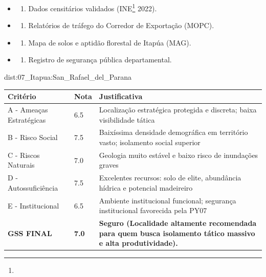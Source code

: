 {\begin{itemize}
\tightlist
\item
  \begin{enumerate}
  \def\labelenumi{\arabic{enumi})}
  \tightlist
  \item
    Dados censitários validados (INE\footnote{\fineINE} 2022).
  \end{enumerate}
\item
  \begin{enumerate}
  \def\labelenumi{\arabic{enumi})}
  \setcounter{enumi}{1}
  \tightlist
  \item
    Relatórios de tráfego do Corredor de Exportação (MOPC).
  \end{enumerate}
\item
  \begin{enumerate}
  \def\labelenumi{\arabic{enumi})}
  \setcounter{enumi}{2}
  \tightlist
  \item
    Mapa de solos e aptidão florestal de Itapúa (MAG).
  \end{enumerate}
\item
  \begin{enumerate}
  \def\labelenumi{\arabic{enumi})}
  \setcounter{enumi}{3}
  \tightlist
  \item
    Registro de segurança pública departamental.
  \end{enumerate}
\end{itemize}}{dist:07_Itapua:San_Rafael_del_Parana}
\begin{table}[ht!]
\small \begin{tabular}{p{3.0cm}p{0.8cm}p{6.0cm}} \toprule
\textbf{Critério} & \textbf{Nota} & \textbf{Justificativa} \\ \midrule
A - Ameaças Estratégicas & 6.5 & Localização estratégica protegida e discreta; baixa visibilidade tática \\
B - Risco Social & 7.5 & Baixíssima densidade demográfica em território vasto; isolamento social superior \\
C - Riscos Naturais & 7.0 & Geologia muito estável e baixo risco de inundações graves \\
D - Autossuficiência & 7.5 & Excelentes recursos: solo de elite, abundância hídrica e potencial madeireiro \\
E - Institucional & 6.5 & Ambiente institucional funcional; segurança institucional favorecida pela PY07 \\
\midrule \textbf{GSS FINAL} & \textbf{7.0} & \textbf{Seguro (Localidade altamente recomendada para quem busca isolamento tático massivo e alta produtividade).} \\ \bottomrule \end{tabular}
\end{table}
